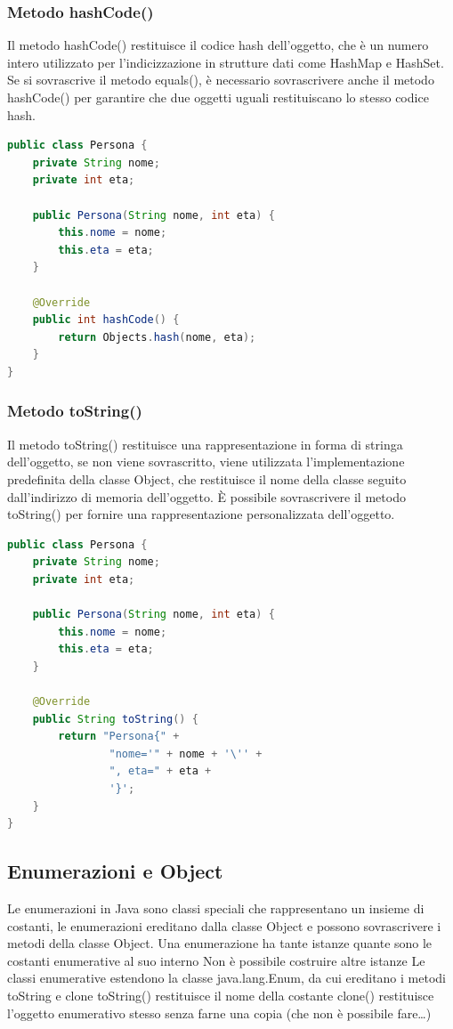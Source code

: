 \documentclass[11pt]{article}
\begin{document}
\subsubsection{Metodo hashCode()}
Il metodo hashCode() restituisce il codice hash dell'oggetto, che è un numero intero utilizzato per l'indicizzazione in strutture dati come HashMap e HashSet.
Se si sovrascrive il metodo equals(), è necessario sovrascrivere anche il metodo hashCode() per garantire che due oggetti uguali restituiscano lo stesso codice hash.
\begin{lstlisting}[language=Java]
public class Persona {
    private String nome;
    private int eta;

    public Persona(String nome, int eta) {
        this.nome = nome;
        this.eta = eta;
    }

    @Override
    public int hashCode() {
        return Objects.hash(nome, eta);
    }
}
\end{lstlisting}
\subsubsection{Metodo toString()}
Il metodo toString() restituisce una rappresentazione in forma di stringa dell'oggetto, se non viene sovrascritto, viene utilizzata l'implementazione predefinita della classe Object,
che restituisce il nome della classe seguito dall'indirizzo di memoria dell'oggetto. È possibile sovrascrivere il metodo toString() per fornire una rappresentazione personalizzata dell'oggetto.
\begin{lstlisting}[language=Java]
public class Persona {
    private String nome;
    private int eta;

    public Persona(String nome, int eta) {
        this.nome = nome;
        this.eta = eta;
    }

    @Override
    public String toString() {
        return "Persona{" +
                "nome='" + nome + '\'' +
                ", eta=" + eta +
                '}';
    }
}
\end{lstlisting}
\subsection{Enumerazioni e Object}
Le enumerazioni in Java sono classi speciali che rappresentano un insieme di costanti,
le enumerazioni ereditano dalla classe Object e possono sovrascrivere i metodi della classe Object.
Una enumerazione ha tante istanze quante sono le
costanti enumerative al suo interno
Non è possibile costruire altre istanze
Le classi enumerative estendono la classe
java.lang.Enum, da cui ereditano i metodi toString
e clone
toString() restituisce il nome della costante
clone() restituisce l’oggetto enumerativo stesso senza
farne una copia (che non è possibile fare…)
\end{document}
